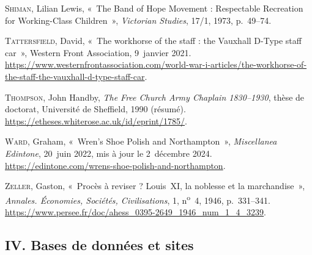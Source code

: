 \begin{biblist}
\item \textsc{Shiman}, Lilian Lewis, «~The Band of Hope Movement : Respectable Recreation for Working-Class Children~», \textit{Victorian Studies}, 17/1, 1973, p.~49--74.
\item \textsc{Tattersfield}, David, «~The workhorse of the staff : the Vauxhall D-Type staff car~», Western Front Association, 9~janvier 2021. \url{https://www.westernfrontassociation.com/world-war-i-articles/the-workhorse-of-the-staff-the-vauxhall-d-type-staff-car}.
\item \textsc{Thompson}, John Handby, \textit{The Free Church Army Chaplain 1830--1930}, thèse de doctorat, Université de Sheffield, 1990 (résumé). \url{https://etheses.whiterose.ac.uk/id/eprint/1785/}.
\item \textsc{Ward}, Graham, «~Wren's Shoe Polish and Northampton~», \textit{Miscellanea Edintone}, 20~juin 2022, mis à jour le 2~décembre 2024. \url{https://edintone.com/wrens-shoe-polish-and-northampton}.
\item \textsc{Zeller}, Gaston, «~Procès à reviser ? Louis~XI, la noblesse et la marchandise~», \textit{Annales. Économies, Sociétés, Civilisations}, 1, n\textsuperscript{o}~4, 1946, p.~331--341. \url{https://www.persee.fr/doc/ahess_0395-2649_1946_num_1_4_3239}.
\end{biblist}

\subsection*{\normalsize\upshape\bfseries IV. Bases de données et sites}

